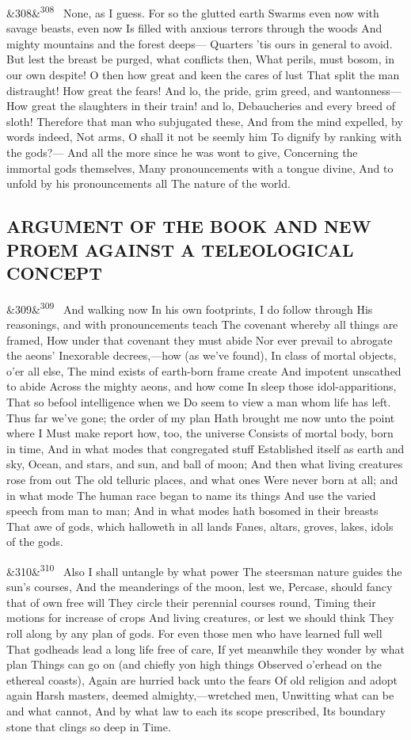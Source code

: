 \documentclass[12pt]{article}
\newcommand{\para}[1][]{\par\noindent\ifx&#1&\else\textsuperscript{\footnotesize #1}~\fi}
\begin{document}
\para[308] None, as I guess. For so the glutted earth Swarms even now with savage beasts, even now Is filled with anxious terrors through the woods And mighty mountains and the forest deeps--- Quarters 'tis ours in general to avoid. But lest the breast be purged, what conflicts then, What perils, must bosom, in our own despite! O then how great and keen the cares of lust That split the man distraught! How great the fears! And lo, the pride, grim greed, and wantonness--- How great the slaughters in their train! and lo, Debaucheries and every breed of sloth! Therefore that man who subjugated these, And from the mind expelled, by words indeed, Not arms, O shall it not be seemly him To dignify by ranking with the gods?--- And all the more since he was wont to give, Concerning the immortal gods themselves, Many pronouncements with a tongue divine, And to unfold by his pronouncements all The nature of the world.

\subsection*{ARGUMENT OF THE BOOK AND NEW PROEM AGAINST A TELEOLOGICAL CONCEPT}

\para[309] And walking now In his own footprints, I do follow through His reasonings, and with pronouncements teach The covenant whereby all things are framed, How under that covenant they must abide Nor ever prevail to abrogate the aeons' Inexorable decrees,---how (as we've found), In class of mortal objects, o'er all else, The mind exists of earth-born frame create And impotent unscathed to abide Across the mighty aeons, and how come In sleep those idol-apparitions, That so befool intelligence when we Do seem to view a man whom life has left. Thus far we've gone; the order of my plan Hath brought me now unto the point where I Must make report how, too, the universe Consists of mortal body, born in time, And in what modes that congregated stuff Established itself as earth and sky, Ocean, and stars, and sun, and ball of moon; And then what living creatures rose from out The old telluric places, and what ones Were never born at all; and in what mode The human race began to name its things And use the varied speech from man to man; And in what modes hath bosomed in their breasts That awe of gods, which halloweth in all lands Fanes, altars, groves, lakes, idols of the gods.

\para[310] Also I shall untangle by what power The steersman nature guides the sun's courses, And the meanderings of the moon, lest we, Percase, should fancy that of own free will They circle their perennial courses round, Timing their motions for increase of crops And living creatures, or lest we should think They roll along by any plan of gods. For even those men who have learned full well That godheads lead a long life free of care, If yet meanwhile they wonder by what plan Things can go on (and chiefly yon high things Observed o'erhead on the ethereal coasts), Again are hurried back unto the fears Of old religion and adopt again Harsh masters, deemed almighty,---wretched men, Unwitting what can be and what cannot, And by what law to each its scope prescribed, Its boundary stone that clings so deep in Time.
\end{document}
